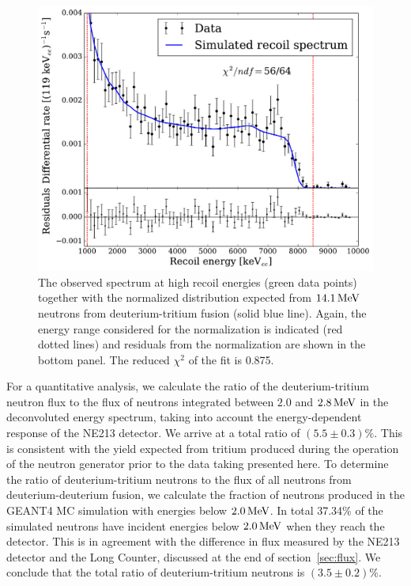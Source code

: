 \begin{figure}[!htbp]
\centering
    \includegraphics[width=\linewidth]{figures/ng/he_spec}
    \caption{The observed spectrum at high recoil energies (green data points) together with the normalized distribution expected from $14.1\,\mathrm{MeV}$ neutrons from deuterium-tritium fusion (solid blue line). Again, the energy range considered for the normalization is indicated (red dotted lines) and residuals from the normalization are shown in the bottom panel. The reduced $\chi^2$ of the fit is 0.875.}\label{fig:he_spec}
\end{figure}

For a quantitative analysis, we calculate the ratio of the deuterium-tritium neutron flux to the flux of neutrons integrated between $2.0$ and $2.8\,\mathrm{MeV}$ in the deconvoluted energy spectrum, taking into account the energy-dependent response of the NE213 detector. We arrive at a total ratio of $(5.5 \pm  0.3)\%$. This is consistent with the yield expected from tritium produced during the operation of the neutron generator prior to the data taking presented here. To determine the ratio of deuterium-tritium neutrons to the flux of all neutrons from deuterium-deuterium fusion, we calculate the fraction of neutrons produced in the GEANT4 MC simulation with energies below $2.0\,\mathrm{MeV}$. In total 37.34\% of the simulated neutrons have incident energies below $2.0\,\mathrm{MeV}$ when they reach the detector. This is in agreement with the difference in flux measured by the NE213 detector and the Long Counter, discussed at the end of section~\ref{sec:flux}. We conclude that the total ratio of deuterium-tritium neutrons is $(3.5 \pm  0.2)\%$.

